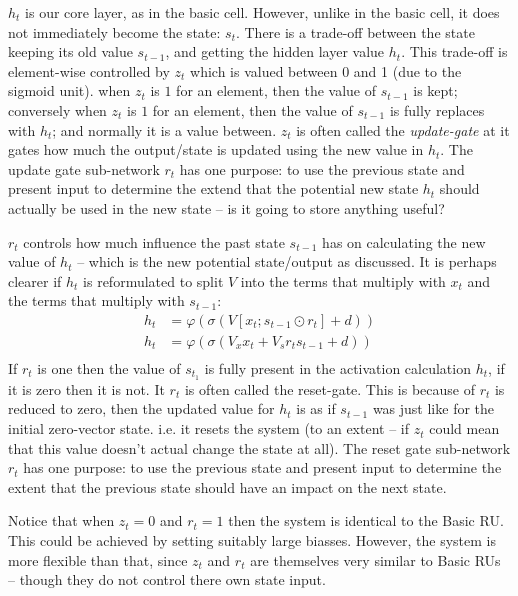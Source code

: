 \documentclass[12pt,parskip]{komatufte}
\begin{document}
$h_t$ is our core layer, as in the basic cell.
However, unlike in the basic cell, it does not immediately become the state: $s_t$.
There is a trade-off between the state keeping its old value $s_{t-1}$, and getting the hidden layer value $h_t$.
This trade-off is element-wise controlled by $z_t$ which is valued between 0 and 1 (due to the sigmoid unit).
when $z_t$ is $1$ for an element, then the value of $s_{t-1}$ is kept;
conversely when $z_t$ is $1$ for an element, then the value of $s_{t-1}$ is fully replaces with $h_t$;
and normally it is a value between.
$z_t$ is often called the \emph{update-gate} at it gates how much the output/state is updated using the new value in $h_t$.
The update gate sub-network $r_t$ has one purpose: to use the previous state and present input to determine the extend that the potential new state $h_t$ should actually be used in the new state -- is it going to store anything useful?

$r_t$ controls how much influence the past state $s_{t-1}$ has on calculating the new value of $h_t$ -- which is the new potential state/output as discussed.
It is perhaps clearer if $h_t$ is reformulated to split $V$ into the terms that multiply with $x_t$ and the terms that multiply with $s_{t-1}$:
\begin{align}
h_t &= \varphi \left( \sigma \left( V[x_t; s_{t-1} \odot r_t] + d \right) \right) \\
h_t &= \varphi \left( \sigma \left( V_x x_t + V_s r_t s_{t-1} + d \right) \right) \\
\end{align}
If $r_t$ is one then the value of $s_{t_1}$ is fully present in the activation calculation $h_t$, if it is zero then it is not.
It $r_t$ is often called the reset-gate.
This is because of $r_t$ is reduced to zero, then the updated value for $h_t$ is as if $s_{t-1}$ was just like for the initial zero-vector state.
i.e. it resets the system (to an extent -- if $z_t$ could mean that this value doesn't actual change the state at all).
The reset gate sub-network $r_t$ has one purpose: to use the previous state and present input to determine the extent that the previous state should have an impact on the next state.

Notice that when $z_t=0$ and $r_t=1$ then the system is identical to the Basic RU.
This could be achieved by setting suitably large biasses.
However, the system is more flexible than that, 
since $z_t$ and $r_t$ are themselves very similar to Basic RUs -- though they do not control there own state input.
\end{document}

